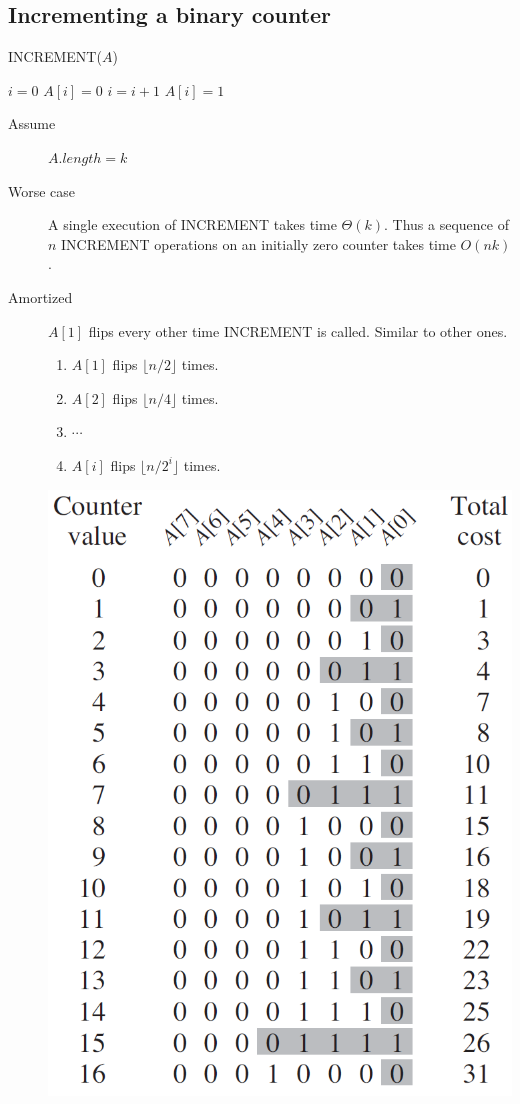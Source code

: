 \documentclass[a4paper]{article}
\begin{document}
\subsection*{Incrementing a binary counter}
\begin{algorithm}[H]%
    \caption{ INCREMENT($A$)}
    \begin{algorithmic}[1] %
        \State $i=0$
            \State $A[i]=0$
            \State $i=i+1$
        \EndWhile
            \State $A[i]=1$
        \EndIf
    \end{algorithmic}
\end{algorithm}
\begin{description}
\item [Assume] $A.length=k$
\item[Worse case] A single execution of INCREMENT takes time $\Theta(k)$. Thus a sequence of $n$ INCREMENT operations on an initially zero counter takes time $O(nk)$.
\item[Amortized] $A[1]$ flips every other time INCREMENT is called. Similar to other ones.
\begin{enumerate}
    \item $A[1]$ flips $\lfloor n/2 \rfloor$ times.
    \item $A[2]$ flips $\lfloor n/4 \rfloor$ times.
    \item $\cdots$
    \item $A[i]$ flips $\lfloor n/{2^i} \rfloor$ times.
\end{enumerate}
\includegraphics[scale=0.4]{"Incrementing a binary counter"}
\end{description}
\end{document}
